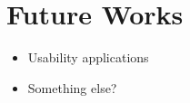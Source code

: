 \section{Future Works}%
\label{sec:future_works}
\begin{itemize}
    \item Usability applications
    \item Something else?
\end{itemize}

